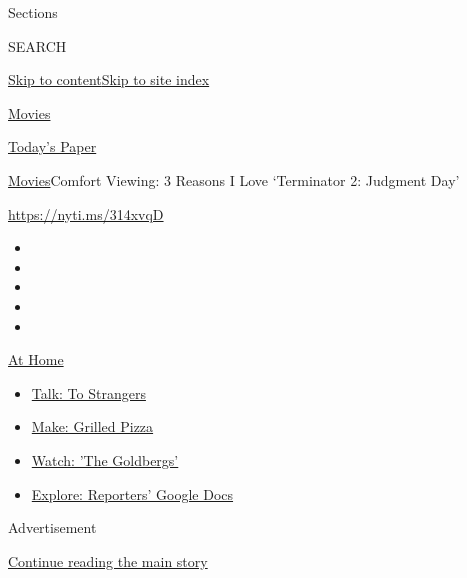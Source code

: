 Sections

SEARCH

\protect\hyperlink{site-content}{Skip to
content}\protect\hyperlink{site-index}{Skip to site index}

\href{https://www.nytimes.com/section/movies}{Movies}

\href{https://myaccount.nytimes.com/auth/login?response_type=cookie\&client_id=vi}{}

\href{https://www.nytimes.com/section/todayspaper}{Today's Paper}

\href{/section/movies}{Movies}\textbar{}Comfort Viewing: 3 Reasons I
Love `Terminator 2: Judgment Day'

\url{https://nyti.ms/314xvqD}

\begin{itemize}
\item
\item
\item
\item
\item
\end{itemize}

\href{https://www.nytimes.com/spotlight/at-home?action=click\&pgtype=Article\&state=default\&region=TOP_BANNER\&context=at_home_menu}{At
Home}

\begin{itemize}
\tightlist
\item
  \href{https://www.nytimes.com/2020/08/03/well/family/the-benefits-of-talking-to-strangers.html?action=click\&pgtype=Article\&state=default\&region=TOP_BANNER\&context=at_home_menu}{Talk:
  To Strangers}
\item
  \href{https://www.nytimes.com/2020/08/01/at-home/coronavirus-make-pizza-on-a-grill.html?action=click\&pgtype=Article\&state=default\&region=TOP_BANNER\&context=at_home_menu}{Make:
  Grilled Pizza}
\item
  \href{https://www.nytimes.com/2020/07/31/arts/television/goldbergs-abc-stream.html?action=click\&pgtype=Article\&state=default\&region=TOP_BANNER\&context=at_home_menu}{Watch:
  'The Goldbergs'}
\item
  \href{https://www.nytimes.com/interactive/2020/at-home/even-more-reporters-editors-diaries-lists-recommendations.html?action=click\&pgtype=Article\&state=default\&region=TOP_BANNER\&context=at_home_menu}{Explore:
  Reporters' Google Docs}
\end{itemize}

Advertisement

\protect\hyperlink{after-top}{Continue reading the main story}

